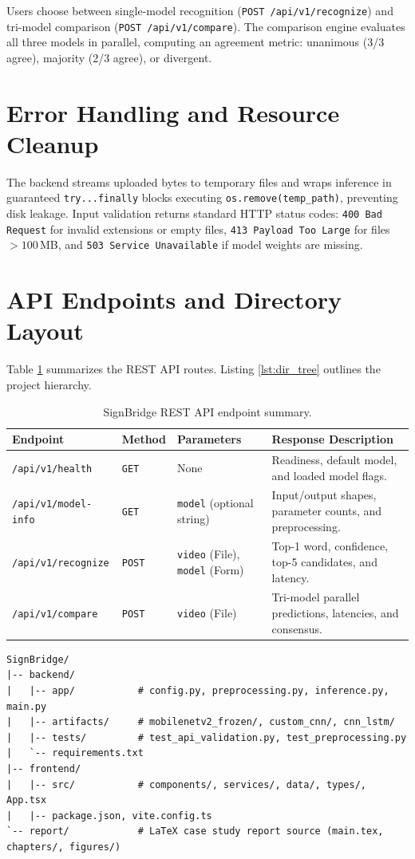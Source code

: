 Users choose between single-model recognition (\texttt{POST /api/v1/recognize}) and tri-model comparison (\texttt{POST /api/v1/compare}). The comparison engine evaluates all three models in parallel, computing an agreement metric: unanimous (3/3 agree), majority (2/3 agree), or divergent.

\section{Error Handling and Resource Cleanup}
\label{sec:error_cleanup}
The backend streams uploaded bytes to temporary files and wraps inference in guaranteed \texttt{try...finally} blocks executing \texttt{os.remove(temp\_path)}, preventing disk leakage. Input validation returns standard HTTP status codes: \texttt{400 Bad Request} for invalid extensions or empty files, \texttt{413 Payload Too Large} for files $>100$\,MB, and \texttt{503 Service Unavailable} if model weights are missing.

\section{API Endpoints and Directory Layout}
\label{sec:api_directory}
Table \ref{tab:api_endpoints} summarizes the REST API routes. Listing \ref{lst:dir_tree} outlines the project hierarchy.

\begin{table}[htbp]
\centering
\caption{SignBridge REST API endpoint summary.}
\label{tab:api_endpoints}
\scriptsize
\begin{tabularx}{\textwidth}{l l p{3.5cm} X}
\toprule
\textbf{Endpoint} & \textbf{Method} & \textbf{Parameters} & \textbf{Response Description} \\
\midrule
\texttt{/api/v1/health} & \texttt{GET} & None & Readiness, default model, and loaded model flags. \\
\texttt{/api/v1/model-info} & \texttt{GET} & \texttt{model} (optional string) & Input/output shapes, parameter counts, and preprocessing. \\
\texttt{/api/v1/recognize} & \texttt{POST} & \texttt{video} (File), \texttt{model} (Form) & Top-1 word, confidence, top-5 candidates, and latency. \\
\texttt{/api/v1/compare} & \texttt{POST} & \texttt{video} (File) & Tri-model parallel predictions, latencies, and consensus. \\
\bottomrule
\end{tabularx}
\end{table}

\begin{lstlisting}[caption={SignBridge repository directory structure.}, label={lst:dir_tree}]
SignBridge/
|-- backend/
|   |-- app/           # config.py, preprocessing.py, inference.py, main.py
|   |-- artifacts/     # mobilenetv2_frozen/, custom_cnn/, cnn_lstm/
|   |-- tests/         # test_api_validation.py, test_preprocessing.py
|   `-- requirements.txt
|-- frontend/
|   |-- src/           # components/, services/, data/, types/, App.tsx
|   |-- package.json, vite.config.ts
`-- report/            # LaTeX case study report source (main.tex, chapters/, figures/)
\end{lstlisting}

